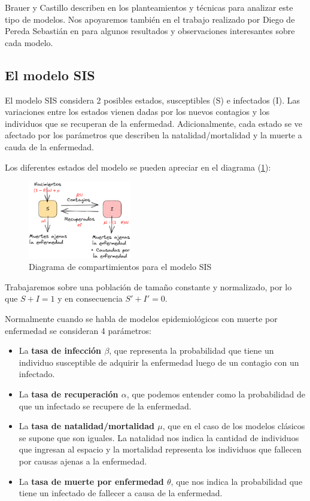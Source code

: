 Brauer y Castillo describen en \cite{mateModelsInPopulationAndEpidemiology} los planteamientos y técnicas para analizar este tipo de modelos. Nos apoyaremos también en el trabajo realizado por Diego de Pereda Sebastián en \cite{diego2010} para algunos resultados y observaciones interesantes sobre cada modelo.

\subsection{El modelo SIS}\label{sub:El modelo SIS}

El modelo SIS considera 2 posibles estados, susceptibles (S) e infectados (I). Las variaciones entre los estados vienen dadas por los nuevos contagios y los individuos que se recuperan de la enfermedad. Adicionalmente, cada estado se ve afectado por los parámetros que describen la natalidad/mortalidad y la muerte a cauda de la enfermedad. 

Los diferentes estados del modelo se pueden apreciar en el diagrama (\ref{fig:diagrama SIS}):

\begin{figure}[h]
  \centering
    \includegraphics[width=0.4\textwidth]{Imagenes/SIS_compartimientos.PNG}
  \caption{Diagrama de compartimientos para el modelo SIS}
  \label{fig:diagrama SIS}
\end{figure}

Trabajaremos sobre una población de tamaño constante y normalizado, por lo que $S + I = 1$ y en consecuencia $S' + I' = 0$.

Normalmente cuando se habla de modelos epidemiológicos con muerte por enfermedad se consideran 4 parámetros: 

\begin{itemize}
    \item La \textbf{tasa de infección $\beta$}, que representa la probabilidad que tiene un individuo susceptible de adquirir la enfermedad luego de un contagio con un infectado.
    \item La \textbf{tasa de recuperación $\alpha$}, que podemos entender como la probabilidad de que un infectado se recupere de la enfermedad.
    \item La \textbf{tasa de natalidad/mortalidad $\mu$}, que en el caso de los modelos clásicos se supone que son iguales. La natalidad nos indica la cantidad de individuos que ingresan al espacio y la mortalidad representa los individuos que fallecen por causas ajenas a la enfermedad.
    \item La \textbf{tasa de muerte por enfermedad $\theta$}, que nos indica la probabilidad que tiene un infectado de fallecer a causa de la enfermedad.
\end{itemize}


